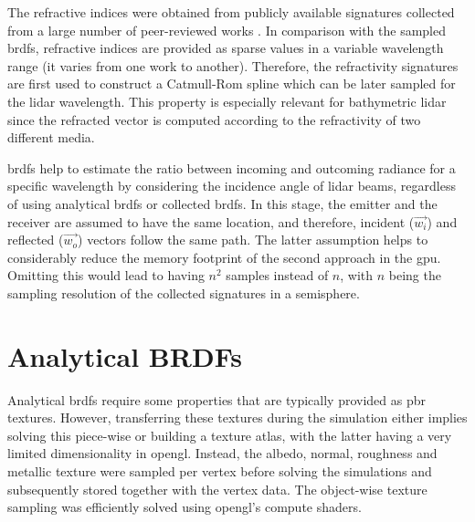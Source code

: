 The refractive indices were obtained from publicly available signatures collected from a large number of peer-reviewed works \cite{mikhail_n_polyanskiy_refractive_nodate}. In comparison with the sampled \acrshort{brdf}s, refractive indices are provided as sparse values in a variable wavelength range (it varies from one work to another). Therefore, the refractivity signatures are first used to construct a Catmull-Rom spline which can be later sampled for the \acrshort{lidar} wavelength. This property is especially relevant for bathymetric \acrshort{lidar} since the refracted vector is computed according to the refractivity of two different media.

\acrshort{brdf}s help to estimate the ratio between incoming and outcoming radiance for a specific wavelength by considering the incidence angle of \acrshort{lidar} beams, regardless of using analytical \acrshort{brdf}s or collected \acrshort{brdf}s. In this stage, the emitter and the receiver are assumed to have the same location, and therefore, incident ($\vec{w_{i}}$) and reflected ($\vec{w_{o}}$) vectors follow the same path. The latter assumption helps to considerably reduce the memory footprint of the second approach in the \acrshort{gpu}. Omitting this would lead to having $n^2$ samples instead of $n$, with $n$ being the sampling resolution of the collected signatures in a semisphere. 

\section{Analytical BRDFs}

Analytical \acrshort{brdf}s require some properties that are typically provided as \acrshort{pbr} textures. However, transferring these textures during the simulation either implies solving this piece-wise or building a texture atlas, with the latter having a very limited dimensionality in \acrshort{opengl}. Instead, the albedo, normal, roughness and metallic texture were sampled per vertex before solving the simulations and subsequently stored together with the vertex data. The object-wise texture sampling was efficiently solved using \acrshort{opengl}'s compute shaders.

